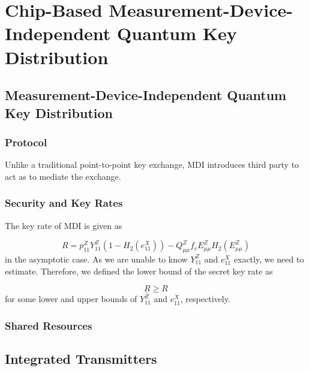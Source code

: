%
%
\glsresetall
\graphicspath{{./chapters/chapter04/fig04/}}

\let\textcircled=\pgftextcircled
\chapter[Chip-Based Measurement-Device-Independent QKD]{Chip-Based Measurement-Device-Independent Quantum Key Distribution}
\label{chap:mdiqkd}

\section{Measurement-Device-Independent Quantum Key Distribution}
\label{sec:mdi-qkd}

\subsection{Protocol}

Unlike a traditional point-to-point key exchange, \ac{MDI} introduces third party to act as to mediate the exchange.  

\subsection{Security and Key Rates}

The key rate of \ac{MDI} is given as

\begin{equation}
	R = p_{11}^Z Y_{11}^Z \left(1 - H_2(e_{11}^X)\right) - Q_{\mu\mu}^Z f_e E_{\mu\mu}^Z H_2(E_{\mu\mu}^Z)
\end{equation}
in the asymptotic case. As we are unable to know $Y_{11}^Z$ and $e_{11}^X$ exactly, we need to estimate. Therefore, we defined the lower bound of the secret key rate as

\begin{equation}
	\underline{R} \geq R
\end{equation}
for some lower and upper bounds of $Y_{11}^Z$ and $e_{11}^X$, respectively.

\subsection{Shared Resources}

\section{Integrated Transmitters}

